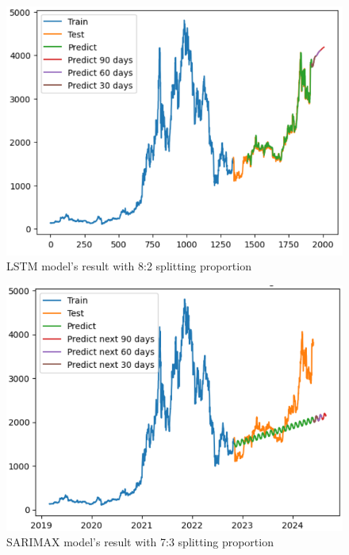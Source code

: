 \documentclass{ieeeojies}
\begin{document}
\begin{figure}[H]
	\centering
	\begin{minipage}{0.8\linewidth}
		\centering
		\includegraphics[width=\linewidth]{bibliography/Images/LSTM_ETH_73.PNG}
		\caption{LSTM model's result with 8:2 splitting proportion}
	\end{minipage}
\end{figure}
\begin{figure}[H]
	\centering
	\begin{minipage}{0.8\linewidth}
		\centering
		\includegraphics[width=\linewidth]{bibliography/Images/SARIMAX_ETH_73.PNG}
		\caption{SARIMAX model's result with 7:3 splitting proportion}
	\end{minipage}
\end{figure}
\end{document}

